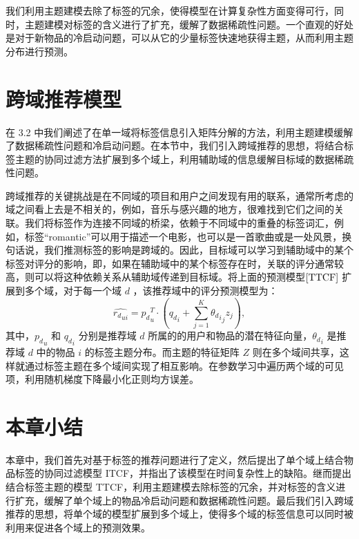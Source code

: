 我们利用主题建模去除了标签的冗余，使得模型在计算复杂性方面变得可行，同时，主题建模对标签的含义进行了扩充，缓解了数据稀疏性问题。一个直观的好处是对于新物品的冷启动问题，可以从它的少量标签快速地获得主题，从而利用主题分布进行预测。


\section{跨域推荐模型}
在 3.2 中我们阐述了在单一域将标签信息引入矩阵分解的方法，利用主题建模缓解了数据稀疏性问题和冷启动问题。在本节中，我们引入跨域推荐的思想，将结合标签主题的协同过滤方法扩展到多个域上，利用辅助域的信息缓解目标域的数据稀疏性问题。

跨域推荐的关键挑战是在不同域的项目和用户之间发现有用的联系，通常所考虑的域之间看上去是不相关的，例如，音乐与感兴趣的地方，很难找到它们之间的关联。我们将标签作为连接不同域的桥梁，依赖于不同域中的重叠的标签词汇，例如，标签“romantic”可以用于描述一个电影，也可以是一首歌曲或是一处风景，换句话说，我们推测标签的影响是跨域的。因此，目标域可以学习到辅助域中的某个标签对评分的影响，即，如果在辅助域中的某个标签存在时，关联的评分通常较高，则可以将这种依赖关系从辅助域传递到目标域。将上面的预测模型$\eqref{TTCF}$ 扩展到多个域，对于每一个域 $d$ ，该推荐域中的评分预测模型为：
\begin{equation}
\hat{{r_d}_{ui}} = {p_d}_u^T \cdot ({q_d}_i +   \sum\limits_{j =1}^K {  {{\theta_d}_i}_j   z_j}  ),
\end{equation}
其中，${p_d}_u$ 和 ${q_d}_i$ 分别是推荐域 $d$ 所属的的用户和物品的潜在特征向量，${\theta_d}_i$ 是推荐域 $d$ 中的物品 $i$ 的标签主题分布。而主题的特征矩阵 $Z$ 则在多个域间共享，这样就通过标签主题在多个域间实现了相互影响。在参数学习中遍历两个域的可见项，利用随机梯度下降最小化正则均方误差。

\section{本章小结}
本章中，我们首先对基于标签的推荐问题进行了定义，然后提出了单个域上结合物品标签的协同过滤模型 ITCF，并指出了该模型在时间复杂性上的缺陷。继而提出结合标签主题的模型 TTCF，利用主题建模去除标签的冗余，并对标签的含义进行扩充，缓解了单个域上的物品冷启动问题和数据稀疏性问题。最后我们引入跨域推荐的思想，将单个域的模型扩展到多个域上，使得多个域的标签信息可以同时被利用来促进各个域上的预测效果。


